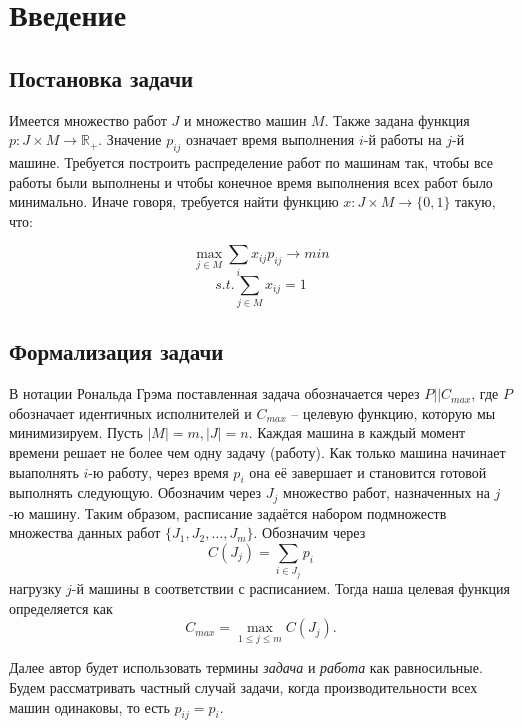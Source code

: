 \section{Введение}

\subsection{Постановка задачи}
Имеется множество работ $J$ и множество машин $M$. Также задана функция $p : J \times M \rightarrow \mathbb{R}_{+}$. Значение $p_{ij}$ означает время выполнения $i$-й работы на $j$-й машине. Требуется построить распределение работ по машинам так, чтобы все работы были выполнены и чтобы конечное время выполнения всех работ было минимально. Иначе говоря, требуется найти функцию $x : J \times M \rightarrow \{0, 1\}$ такую, что:

$$\max_{j \in M} \sum_{i} x_{ij}p_{ij} \rightarrow min$$
$$s.t. \sum_{j \in M} x_{ij} = 1$$

\subsection{Формализация задачи}
В нотации Рональда Грэма поставленная задача обозначается через $P||C_{max}$, где $P$ обозначает идентичных исполнителей и $C_{max}$ -- целевую функцию, которую мы минимизируем. Пусть $|M| = m, |J| = n$. Каждая машина в каждый момент времени решает не более чем одну задачу (работу). Как только машина начинает выаполнять $i$-ю работу, через время $p_{i}$ она её завершает и становится готовой выполнять следующую. Обозначим через $J_{j}$ множество работ, назначенных на $j$-ю машину. Таким образом, расписание задаётся набором подмножеств множества данных работ $\{J_{1}, J_{2},\ldots, J_{m}\}$. Обозначим через $$C(J_{j}) = \sum_{i \in J_{j}} p_{i}$$ нагрузку $j$-й машины в соответствии с расписанием. Тогда наша целевая функция определяется как $$C_{max} = \max_{1 \leq j \leq m} C(J_{j}).$$

\noindent
Далее автор будет использовать термины \textit{задача} и \textit{работа} как равносильные. Будем рассматривать частный случай задачи, когда производительности всех машин одинаковы, то есть $p_{ij} = p_{i}$.